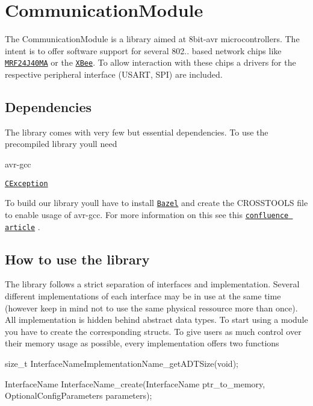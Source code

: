 \section*{Communication\+Module}

The Communication\+Module is a library aimed at 8bit-\/avr microcontrollers. The intent is to offer software support for several 802.. based network chips like \href{https://www.microchip.com/wwwproducts/en/MRF24J40MA}{\tt M\+R\+F24\+J40\+MA} or the \href{https://www.digi.com/products/xbee-rf-solutions/2-4-ghz-modules/xbee-802-15-4#productsupport}{\tt X\+Bee}. To allow interaction with these chips a drivers for the respective peripheral interface (U\+S\+A\+RT, S\+PI) are included.

\subsection*{Dependencies}

The library comes with very few but essential dependencies. To use the precompiled library you\textquotesingle{}ll need
\begin{DoxyEnumerate}
\item avr-\/gcc
\item \href{https://github.com/ThrowTheSwitch/CException}{\tt C\+Exception}
\end{DoxyEnumerate}

To build our library you\textquotesingle{}ll have to install \href{https://bazel.build}{\tt Bazel} and create the C\+R\+O\+S\+S\+T\+O\+O\+LS file to enable usage of avr-\/gcc. For more information on this see this \href{http://confluence.es.uni-due.de:8090/pages/viewpage.action?pageId=23953429}{\tt confluence article} .

\subsection*{How to use the library}

The library follows a strict separation of interfaces and implementation. Several different implementations of each interface may be in use at the same time (however keep in mind not to use the same physical ressource more than once). All implementation is hidden behind abstract data types. To start using a module you have to create the corresponding structs. To give users as much control over their memory usage as possible, every implementation offers two functions


\begin{DoxyEnumerate}
\item size\+\_\+t Interface\+Name\+Implementation\+Name\+\_\+get\+A\+D\+T\+Size(void);
\item Interface\+Name Interface\+Name\+\_\+create(\+Interface\+Name ptr\+\_\+to\+\_\+memory, Optional\+Config\+Parameters parameters);
\end{DoxyEnumerate}

